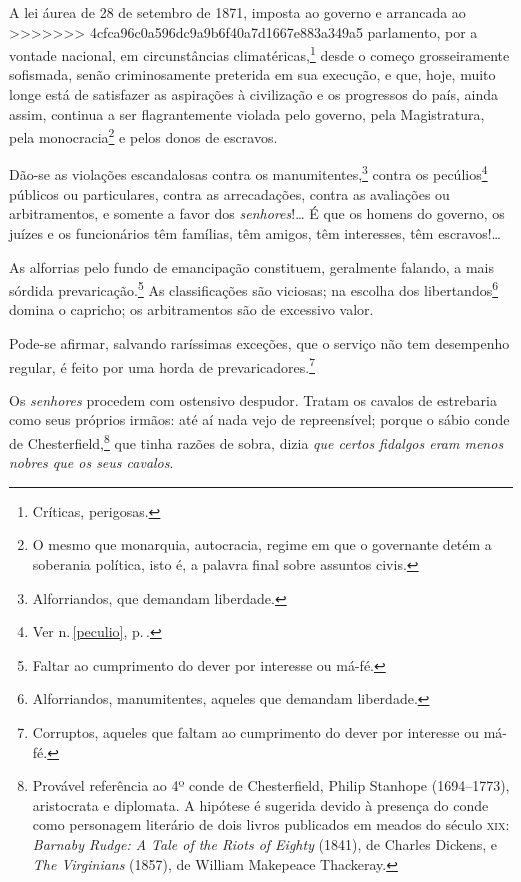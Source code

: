 A lei áurea de 28 de setembro de 1871, imposta ao governo e arrancada ao
>>>>>>> 4cfca96c0a596dc9a9b6f40a7d1667e883a349a5
parlamento, por a vontade nacional, em circunstâncias
climatéricas,\footnote{Críticas, perigosas.} desde o começo
grosseiramente sofismada, senão criminosamente preterida em sua
execução, e que, hoje, muito longe está de satisfazer as aspirações à
civilização e os progressos do país, ainda assim, continua a ser
flagrantemente violada pelo governo, pela Magistratura, pela
monocracia\footnote{O mesmo que monarquia, autocracia, regime em que o
  governante detém a soberania política, isto é, a palavra final sobre
  assuntos civis.} e pelos donos de escravos.

Dão-se as violações escandalosas contra os manumitentes,\footnote{
  Alforriandos, que demandam liberdade.} contra os pecúlios\footnote{
  Ver n.\,\ref{peculio}, p.\,\pageref{peculio}.} públicos ou particulares, contra
as arrecadações, contra as avaliações ou arbitramentos, e somente a
favor dos \emph{senhores}!\ldots{} É que os homens do governo, os juízes e os
funcionários têm famílias, têm amigos, têm interesses, têm escravos!\ldots{}

As alforrias pelo fundo de emancipação constituem, geralmente falando, a mais sórdida
prevaricação.\footnote{
  Faltar ao cumprimento do dever por interesse ou má-fé.} As
classificações são viciosas; na escolha dos libertandos\footnote{
  Alforriandos, manumitentes, aqueles que demandam liberdade.} domina o
capricho; os arbitramentos são de excessivo valor.

Pode-se afirmar, salvando raríssimas exceções, que o serviço não tem
desempenho regular, é feito por uma horda de prevaricadores.\footnote{
  Corruptos, aqueles que   faltam ao cumprimento do dever por interesse ou má-fé.}

Os \emph{senhores} procedem com ostensivo despudor. Tratam os cavalos de
estrebaria como seus próprios irmãos: até aí nada vejo de repreensível;
porque o sábio conde de Chesterfield,\footnote{Provável referência ao
 4º conde de Chesterfield, Philip Stanhope (1694--1773), aristocrata e
 diplomata. A hipótese é sugerida devido à presença do conde como
  personagem literário de dois livros publicados em meados do século
  \textsc{xix}: \emph{Barnaby Rudge: A Tale of the Riots of Eighty} (1841), de
  Charles Dickens, e \emph{The Virginians} (1857), de William Makepeace 
  Thackeray.} que tinha razões de sobra, dizia \emph{que certos fidalgos
eram menos nobres que os seus cavalos}.

